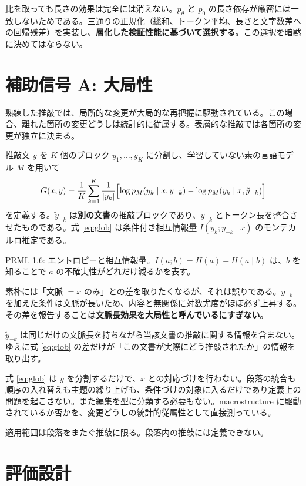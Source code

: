 \documentclass[a4paper,10.5pt]{ltjsarticle}
\newcommand{\prml}[1]{%
  \par\vspace{5pt}%
  \noindent\hspace*{1.6em}%
  \begin{minipage}{\dimexpr\linewidth-3.2em\relax}
    \color{black!55}\sffamily\footnotesize #1
  \end{minipage}%
  \par\vspace{6pt}}
\begin{document}
比を取っても長さの効果は完全には消えない。$p_\theta$ と $p_0$ の長さ依存が厳密には一致しないためである。三通りの正規化（総和、トークン平均、長さと文字数差への回帰残差）を実装し、\textbf{層化した検証性能に基づいて選択する}。この選択を暗黙に決めてはならない。

\section{補助信号 A: 大局性}

熟練した推敲では、局所的な変更が大局的な再把握に駆動されている。この場合、離れた箇所の変更どうしは統計的に従属する。表層的な推敲では各箇所の変更が独立に決まる。

推敲文 $y$ を $K$ 個のブロック $y_1,\dots,y_K$ に分割し、学習していない素の言語モデル $M$ を用いて
\begin{equation}
  G(x,y) = \frac{1}{K}\sum_{k=1}^{K} \frac{1}{|y_k|}
  \Bigl[\log p_M(y_k \mid x, y_{-k}) - \log p_M(y_k \mid x, \tilde{y}_{-k})\Bigr]
  \label{eq:glob}
\end{equation}
を定義する。$\tilde{y}_{-k}$ は\textbf{別の文書}の推敲ブロックであり、$y_{-k}$ とトークン長を整合させたものである。式 \eqref{eq:glob} は条件付き相互情報量 $I(y_k ; y_{-k} \mid x)$ のモンテカルロ推定である。

\prml{PRML 1.6: エントロピーと相互情報量。$I(a;b) = H(a) - H(a \mid b)$ は、$b$ を知ることで $a$ の不確実性がどれだけ減るかを表す。}

\begin{warnbox}[title=統制条件の必要性]
素朴には「文脈 $=x$ のみ」との差を取りたくなるが、それは誤りである。$y_{-k}$ を加えた条件は文脈が長いため、内容と無関係に対数尤度がほぼ必ず上昇する。その差を報告することは\textbf{文脈長効果を大局性と呼んでいるにすぎない}。

$\tilde{y}_{-k}$ は同じだけの文脈長を持ちながら当該文書の推敲に関する情報を含まない。ゆえに式 \eqref{eq:glob} の差だけが「この文書が実際にどう推敲されたか」の情報を取り出す。
\end{warnbox}

式 \eqref{eq:glob} は $y$ を分割するだけで、$x$ との対応づけを行わない。段落の統合も順序の入れ替えも主題の繰り上げも、条件づけの対象に入るだけであり定義上の問題を起こさない。また編集を型に分類する必要もない。macrostructure に駆動されているか否かを、変更どうしの統計的従属性として直接測っている。

適用範囲は段落をまたぐ推敲に限る。段落内の推敲には定義できない。

\section{評価設計}
\end{document}
